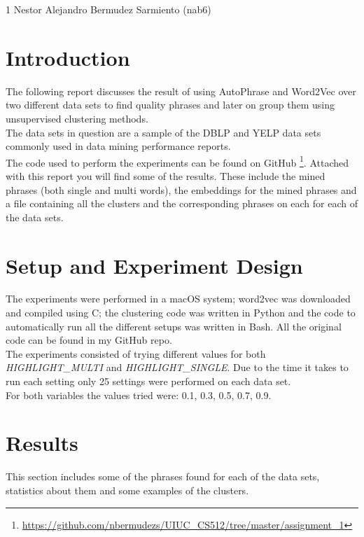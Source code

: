 \documentclass[11pt]{article}
\begin{document}
\homework
    {1}
    {Nestor Alejandro Bermudez Sarmiento (nab6)}
    {}

\section*{Introduction}
The following report discusses the result of using AutoPhrase and Word2Vec over two different data sets to find quality phrases and later on group them using unsupervised clustering methods.\\

The data sets in question are a sample of the DBLP and YELP data sets commonly used in data mining performance reports. \\

The code used to perform the experiments can be found on GitHub \footnote{\url{https://github.com/nbermudezs/UIUC_CS512/tree/master/assignment_1}}. Attached with this report you will find some of the results. These include the mined phrases (both single and multi words), the embeddings for the mined phrases and a file containing all the clusters and the corresponding phrases on each for each of the data sets.

\section*{Setup and Experiment Design}
The experiments were performed in a macOS system; word2vec was downloaded and compiled using C; the clustering code was written in Python and the code to automatically run all the different setups was written in Bash. All the original code can be found in my GitHub repo.\\

The experiments consisted of trying different values for both \textit{HIGHLIGHT\_MULTI} and \textit{HIGHLIGHT\_SINGLE}. Due to the time it takes to run each setting only 25 settings were performed on each data set. \\
For both variables the values tried were: 0.1, 0.3, 0.5, 0.7, 0.9.

\section*{Results}
This section includes some of the phrases found for each of the data sets, statistics about them and some examples of the clusters. \\
\end{document}
